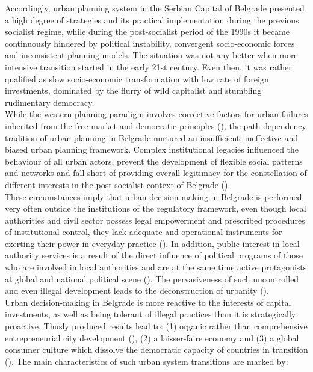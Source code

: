 \documentclass[11pt]{report}
\begin{document}
Accordingly,  urban planning system in the Serbian Capital  of  Belgrade presented  a  high  degree  of  strategies  and  its practical  implementation  during  the  previous  socialist  regime,  while during the post-socialist period of the 1990s  it became  continuously  hindered  by  political instability, convergent socio-economic forces and inconsistent planning models.
The situation was not any better when more intensive transition started in the early 21st century. Even then, it was rather qualified as slow socio-economic transformation with low rate of foreign investments,  dominated  by  the  flurry  of  wild  capitalist  and  stumbling  rudimentary democracy.
\\

While the western planning paradigm involves corrective factors for urban failures inherited from the free market and democratic principles (\citealt{Nedovic-Budic 2001}), the path dependency tradition of urban planning in Belgrade nurtured an insufficient, ineffective and biased urban  planning  framework. 
Complex institutional  legacies  influenced  the  behaviour  of  all  urban  actors,  prevent  the  development  of  flexible  social  patterns  and networks and fall short of providing overall legitimacy for the constellation of different interests in the post-socialist context of Belgrade (\citealt{Petrovic 2009}).
\\

These circumstances imply that urban decision-making in Belgrade is performed very often outside the  institutions of the regulatory framework, even though local authorities and civil sector possess legal empowerment and prescribed procedures of institutional control, they lack adequate and  operational  instruments  for  exerting  their  power in everyday practice  (\citealt{Bajec  2009}).
In addition, public interest in local authority services is a result of the direct influence of political programs of those who are involved in local authorities and are at the same time active protagonists at global and national political scene  (\citealt{Djokic et al. 2007}). The pervasiveness of such uncontrolled and even illegal development leads to the deconstruction of urbanity (\citealt{Vujovic et al. 2007}).
\\

Urban decision-making in Belgrade is more reactive to the interests of capital investments, as well as being tolerant of illegal practices than it is strategically proactive.
Thusly produced results lead to:
(1) organic rather than comprehensive entrepreneurial city development (\citealt{Petrovic 2009}),
(2) a laisser-faire economy and
(3) a global consumer culture which dissolve the democratic 
capacity of countries in transition (\citealt{Ellin 1999}).
The main characteristics of such urban system transitions  are marked by: 
\end{document}
